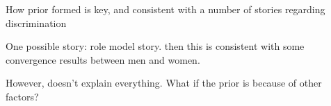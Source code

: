 \documentclass[10 pt]{article}
\newcommand{\nobib}[1]{}
\newcommand{\nobib}[1]{#1}
\begin{document}
{\begin{blist}

\item How prior formed is key, and consistent with a number of stories regarding discrimination

\item One possible story: role model story. then this is consistent with some convergence results between men and women.

\item However, doesn't explain everything. What if the prior is because of other factors?

\end{blist}








} %


\nobib{\printbibliography}
\end{document}
